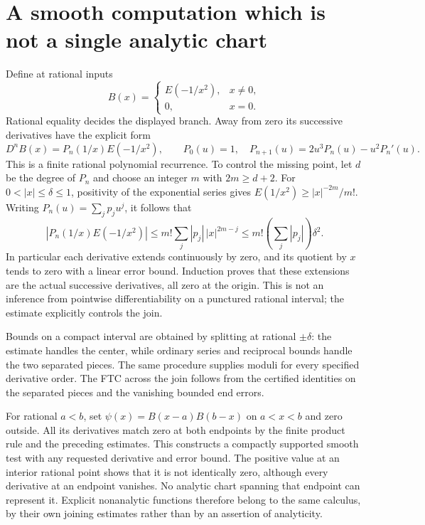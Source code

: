 \section{A smooth computation which is not a single analytic chart}
\label{sec:flat-cutoff}
Define at rational inputs
\[
 B(x)=\begin{cases}E(-1/x^2),&x\ne0,\\0,&x=0.\end{cases}
\]
Rational equality decides the displayed branch.  Away from zero its
successive derivatives have the explicit form
\[
 D^nB(x)=P_n(1/x)E(-1/x^2),\qquad
 P_0(u)=1,\quad P_{n+1}(u)=2u^3P_n(u)-u^2P_n'(u).
\]
This is a finite rational polynomial recurrence.  To control the missing
point, let $d$ be the degree of $P_n$ and choose an integer $m$ with
$2m\ge d+2$.  For $0<|x|\le\delta\le1$, positivity of the exponential
series gives $E(1/x^2)\ge |x|^{-2m}/m!$.  Writing
$P_n(u)=\sum_j p_ju^j$, it follows that
\[
 |P_n(1/x)E(-1/x^2)|
 \le m!\sum_j|p_j|\,|x|^{2m-j}
 \le m!\left(\sum_j|p_j|\right)\delta^2.
\]
In particular each derivative extends continuously by zero, and its
quotient by $x$ tends to zero with a linear error bound.  Induction proves
that these extensions are the actual successive derivatives, all zero
at the origin.  This is not an inference from pointwise differentiability
on a punctured rational interval; the estimate explicitly controls the join.

Bounds on a compact interval are obtained by splitting at rational
$\pm\delta$: the estimate handles the center, while ordinary series and
reciprocal bounds handle the two separated pieces.  The same procedure
supplies moduli for every specified derivative order.  The FTC across the
join follows from the certified identities on the separated pieces and
the vanishing bounded end errors.

For rational $a<b$, set $\psi(x)=B(x-a)B(b-x)$ on $a<x<b$ and zero
outside.  All its derivatives match zero at both endpoints by the finite
product rule and the preceding estimates.  This constructs a compactly
supported smooth test with any requested derivative and error bound.
The positive value at an interior rational point shows that it is not
identically zero, although every derivative at an endpoint vanishes.
No analytic chart spanning that endpoint can represent it.  Explicit
nonanalytic functions therefore belong to the same calculus, by their
own joining estimates rather than by an assertion of analyticity.

